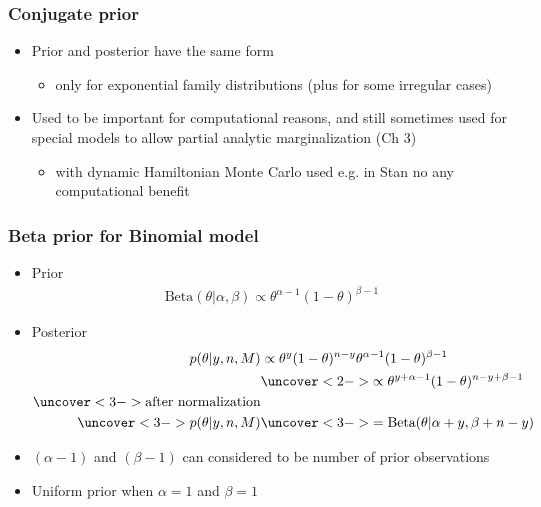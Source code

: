 \documentclass[10pt,handout]{beamer}
\begin{document}
\begin{frame}

  \frametitle{Conjugate prior}

  \begin{itemize}
  \item Prior and posterior have the same form
    \begin{itemize}
    \item only for exponential family distributions (plus for
      some irregular cases)
    \end{itemize}
  \item Used to be important for computational reasons, and still
    sometimes used for special models to allow partial analytic
    marginalization (Ch 3)
    \begin{itemize}
    \item with dynamic Hamiltonian Monte Carlo used e.g. in Stan no any
      computational benefit
    \end{itemize}
  \end{itemize}

\end{frame}

\begin{frame}

  \frametitle{Beta prior for Binomial model}

  \begin{itemize}
  \item Prior \baselineskip
    \begin{align*}
      \text{Beta}(\theta|\alpha,\beta) \propto \theta^{\alpha-1}
      (1-\theta)^{\beta-1}
    \end{align*}
  \item Posterior
    \baselineskip
    \begin{align*}
      p(\theta|y,n,M) & \propto \theta^y(1-\theta)^{n-y}
      \theta^{\alpha-1} (1-\theta)^{\beta-1}\\
      &\uncover<2->{ \propto
        \theta^{y+\alpha-1} (1-\theta)^{n-y+\beta-1}}\\
      \uncover<3->{\text{after normalization}} &\\
      \uncover<3->{p(\theta|y,n,M)}
      &\uncover<3->{ = \text{Beta}(\theta|\alpha+y,\beta+n-y)}
    \end{align*}
    \vskip -2mm
  \item<4-> $(\alpha-1)$ and $(\beta-1)$ can considered to be number of prior observations
  \item<4-> Uniform prior when $\alpha=1$ and $\beta=1$
  \end{itemize}
\end{frame}
\end{document}
